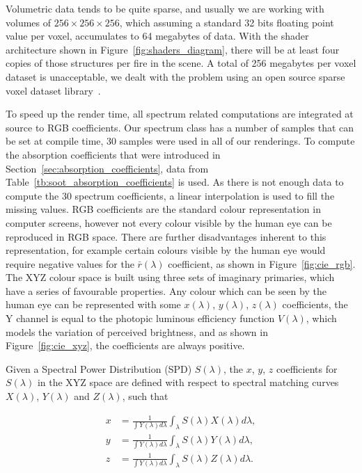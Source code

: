 Volumetric data tends to be quite sparse, and usually we are working with volumes of $256 \times 256 \times 256$, which assuming a standard 32 bits floating point value per voxel, accumulates to 64 megabytes of data.
With the shader architecture shown in Figure~\ref{fig:shaders_diagram}, there will be at least four copies of those structures per fire in the scene.
A total of 256 megabytes per voxel dataset is unacceptable, we dealt with the problem using an open source sparse voxel dataset library~\cite{OpenVDB}.

To speed up the render time, all spectrum related computations are integrated at source to RGB coefficients.
Our spectrum class has a number of samples that can be set at compile time, 30 samples were used in all of our renderings.
To compute the absorption coefficients that were introduced in Section~\ref{sec:absorption_coefficients}, data from Table~\ref{tb:soot_absorption_coefficients} is used.
As there is not enough data to compute the 30 spectrum coefficients, a linear interpolation is used to fill the missing values.
RGB coefficients are the standard colour representation in computer screens, however not every colour visible by the human eye can be reproduced in RGB space.
There are further disadvantages inherent to this representation, for example certain colours visible by the human eye would require negative values for the $\bar{r}(\lambda)$ coefficient, as shown in Figure~\ref{fig:cie_rgb}.
The XYZ colour space is built using three sets of imaginary primaries, which have a series of favourable properties.
Any colour which can be seen by the human eye can be represented with some $x(\lambda)$, $y(\lambda)$, $z(\lambda)$ coefficients, the Y channel is equal to the photopic luminous efficiency function $V(\lambda)$, which models the variation of perceived brightness, and as shown in Figure~\ref{fig:cie_xyz}, the coefficients are always positive.

Given a Spectral Power Distribution (SPD) $S(\lambda)$, the $x$, $y$, $z$ coefficients for $S(\lambda)$ in the XYZ space are defined with respect to spectral matching curves $X(\lambda)$, $Y(\lambda)$ and $Z(\lambda)$, such that

\begin{equation}
\begin{split}
x &= \frac{1}{\int Y(\lambda) d\lambda} \int_\lambda S(\lambda) X(\lambda) d\lambda, \\
y &= \frac{1}{\int Y(\lambda) d\lambda} \int_\lambda S(\lambda) Y(\lambda) d\lambda, \\
z &= \frac{1}{\int Y(\lambda) d\lambda} \int_\lambda S(\lambda) Z(\lambda) d\lambda.
\end{split}
\end{equation}

